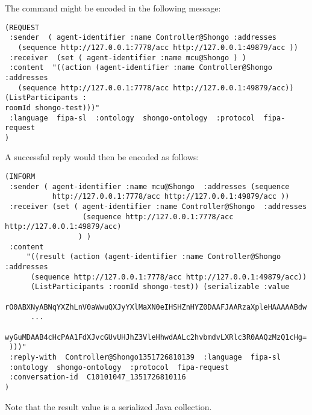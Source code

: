The command might be encoded in the following message:
\begin{verbatim}
(REQUEST
 :sender  ( agent-identifier :name Controller@Shongo :addresses
   (sequence http://127.0.0.1:7778/acc http://127.0.0.1:49879/acc ))
 :receiver  (set ( agent-identifier :name mcu@Shongo ) )
 :content  "((action (agent-identifier :name Controller@Shongo :addresses
   (sequence http://127.0.0.1:7778/acc http://127.0.0.1:49879/acc)) (ListParticipants :
roomId shongo-test)))"
 :language  fipa-sl  :ontology  shongo-ontology  :protocol  fipa-request
)
\end{verbatim}

A successful reply would then be encoded as follows:
\begin{verbatim}
(INFORM
 :sender ( agent-identifier :name mcu@Shongo  :addresses (sequence
           http://127.0.0.1:7778/acc http://127.0.0.1:49879/acc ))
 :receiver (set ( agent-identifier :name Controller@Shongo  :addresses
                  (sequence http://127.0.0.1:7778/acc http://127.0.0.1:49879/acc)
                 ) )
 :content
     "((result (action (agent-identifier :name Controller@Shongo :addresses
      (sequence http://127.0.0.1:7778/acc http://127.0.0.1:49879/acc))
      (ListParticipants :roomId shongo-test)) (serializable :value
      rO0ABXNyABNqYXZhLnV0aWwuQXJyYXlMaXN0eIHSHZnHYZ0DAAFJAARzaXpleHAAAAABdw
      ...
      wyGuMDAAB4cHcPAA1FdXJvcGUvUHJhZ3VleHhwdAALc2hvbmdvLXRlc3R0AAQzMzQ1cHg=
 )))"
 :reply-with  Controller@Shongo1351726810139  :language  fipa-sl
 :ontology  shongo-ontology  :protocol  fipa-request
 :conversation-id  C10101047_1351726810116
)
\end{verbatim}
Note that the result value is a serialized Java collection.
